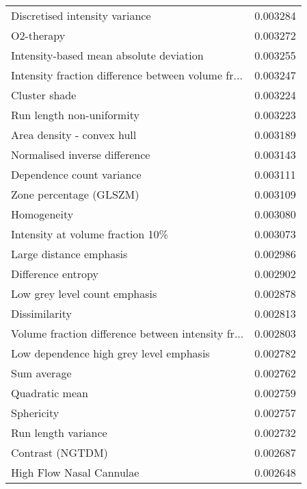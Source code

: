 \begin{tabular}{lr}
Discretised intensity variance                     &        0.003284 \\
O2-therapy                                         &        0.003272 \\
Intensity-based mean absolute deviation            &        0.003255 \\
Intensity fraction difference between volume fr... &        0.003247 \\
Cluster shade                                      &        0.003224 \\
Run length non-uniformity                          &        0.003223 \\
Area density - convex hull                         &        0.003189 \\
Normalised inverse difference                      &        0.003143 \\
Dependence count variance                          &        0.003111 \\
Zone percentage (GLSZM)                            &        0.003109 \\
Homogeneity                                        &        0.003080 \\
Intensity at volume fraction 10\%                   &        0.003073 \\
Large distance emphasis                            &        0.002986 \\
Difference entropy                                 &        0.002902 \\
Low grey level count emphasis                      &        0.002878 \\
Dissimilarity                                      &        0.002813 \\
Volume fraction difference between intensity fr... &        0.002803 \\
Low dependence high grey level emphasis            &        0.002782 \\
Sum average                                        &        0.002762 \\
Quadratic mean                                     &        0.002759 \\
Sphericity                                         &        0.002757 \\
Run length variance                                &        0.002732 \\
Contrast (NGTDM)                                   &        0.002687 \\
High Flow Nasal Cannulae                           &        0.002648 \\

\end{tabular}
